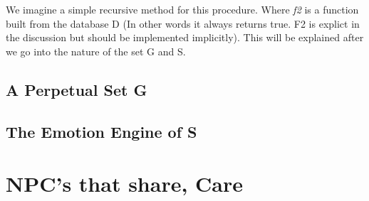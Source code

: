 \documentclass[11pt,twocolumn]{article}
\begin{document}
We imagine a simple recursive method for this procedure.  Where \textit{f2} is a function built from the database D (In other words it always returns true.  F2 is explict in the discussion but should be implemented implicitly).  This will be explained after we go into the nature of the set G and S.


  \subsection{A Perpetual Set G}
  \subsection{The Emotion Engine of S}
\section{NPC's that share,  Care}
\end{document}
